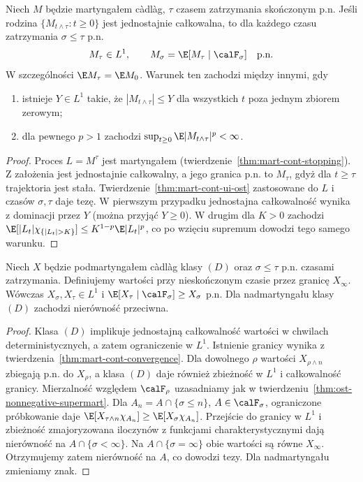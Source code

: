 \begin{twierdzenie}
\label{thm:ost-stopped-ui}
Niech $M$ będzie martyngałem c\`adl\`ag,
$\tau$ czasem zatrzymania skończonym p.n.
Jeśli rodzina $\{M_{t\wedge\tau}:t\ge0\}$
jest jednostajnie całkowalna, to dla każdego
czasu zatrzymania $\sigma\le\tau$ p.n.
\[
M_\tau\in L^1,\qquad
M_\sigma=\E[M_\tau\mid\calF_\sigma]\quad\text{p.n.}
\]
W szczególności $\E M_\tau=\E M_0$.
Warunek ten zachodzi między innymi, gdy
\begin{enumerate}
\item istnieje $Y\in L^1$ takie, że
$|M_{t\wedge\tau}|\le Y$ dla wszystkich $t$
poza jednym zbiorem zerowym;
\item dla pewnego $p>1$ zachodzi
$\sup_{t\ge0}\E|M_{t\wedge\tau}|^p<\infty$.
\end{enumerate}
\end{twierdzenie}
\begin{proof}
Proces $L=M^\tau$ jest martyngałem
(twierdzenie~\ref{thm:mart-cont-stopping}).
Z założenia jest jednostajnie całkowalny,
a jego granica p.n. to $M_\tau$, gdyż
dla $t\ge\tau$ trajektoria jest stała.
Twierdzenie~\ref{thm:mart-cont-ui-ost}
zastosowane do $L$ i czasów $\sigma,\tau$
daje tezę. W pierwszym przypadku
jednostajna całkowalność wynika z dominacji
przez $Y$ (można przyjąć $Y\ge0$).
W drugim dla $K>0$ zachodzi
$\E[|L_t|\chi_{\{|L_t|>K\}}]\le
K^{1-p}\E|L_t|^p$, co po wzięciu supremum
dowodzi tego samego warunku.
\end{proof}

\begin{wniosek}
\label{cor:ost-class-d}
Niech $X$ będzie podmartyngałem c\`adl\`ag klasy $(D)$
oraz $\sigma\le\tau$ p.n. czasami zatrzymania.
Definiujemy wartości przy nieskończonym czasie
przez granicę $X_\infty$.
Wówczas $X_\sigma,X_\tau\in L^1$ i
$\E[X_\tau\mid\calF_\sigma]\ge X_\sigma$ p.n.
Dla nadmartyngału klasy $(D)$ zachodzi
nierówność przeciwna.
\end{wniosek}
\begin{proof}
Klasa $(D)$ implikuje jednostajną całkowalność
wartości w chwilach deterministycznych, a zatem
ograniczenie w $L^1$. Istnienie granicy wynika
z twierdzenia~\ref{thm:mart-cont-convergence}.
Dla dowolnego $\rho$ wartości $X_{\rho\wedge n}$
zbiegają p.n. do $X_\rho$, a klasa $(D)$ daje
również zbieżność w $L^1$ i całkowalność granicy.
Mierzalność względem $\calF_\rho$ uzasadniamy
jak w twierdzeniu~\ref{thm:ost-nonnegative-supermart}.
Dla $A_n=A\cap\{\sigma\le n\}$,
$A\in\calF_\sigma$, ograniczone próbkowanie daje
$\E[X_{\tau\wedge n}\chi_{A_n}]\ge
\E[X_\sigma\chi_{A_n}]$.
Przejście do granicy w $L^1$ i zbieżność
zmajoryzowana iloczynów z funkcjami charakterystycznymi
dają nierówność na $A\cap\{\sigma<\infty\}$.
Na $A\cap\{\sigma=\infty\}$ obie wartości są równe
$X_\infty$. Otrzymujemy zatem nierówność na $A$,
co dowodzi tezy. Dla nadmartyngału zmieniamy znak.
\end{proof}

